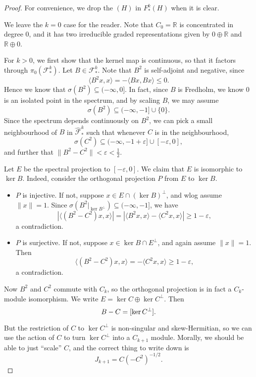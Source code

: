 \documentclass{shortart}
\theoremstyle{definition}
\newcommand\R{\mathbb{R}}
\newcommand\bra\langle
\newcommand\ket\rangle
\let\index\relax %
\DeclareMathOperator{\index}{idx}
\begin{document}
\begin{proof}
  For convenience, we drop the $(H)$ in $F^k_*(H)$ when it is clear.

  We leave the $k = 0$ case for the reader. Note that $C_0 = \R$ is concentrated in degree $0$, and it has two irreducible graded representations given by $0 \oplus \R$ and $\R \oplus 0$.

  For $k > 0$, we first show that the kernel map is continuous, so that it factors through $\pi_0(\mathcal{F}_*^k)$. Let $B \in \mathcal{F}^k_*$. Note that $B^2$ is self-adjoint and negative, since
  \[
    \bra B^2 x, x\ket = -\bra Bx, Bx\ket \leq 0.
  \]
  Hence we know that $\sigma(B^2) \subseteq (-\infty, 0]$. In fact, since $B$ is Fredholm, we know $0$ is an isolated point in the spectrum, and by scaling $B$, we may assume
  \[
    \sigma(B^2) \subseteq (-\infty, -1] \cup \{0\}.
  \]
  Since the spectrum depends continuously on $B^2$, we can pick a small neighbourhood of $B$ in $\hat{\mathcal{F}}^k_*$ such that whenever $C$ is in the neighbourhood,
  \[
    \sigma(C^2) \subseteq (-\infty, -1 + \varepsilon] \cup [-\varepsilon, 0],
  \]
  and further that $\|B^2 - C^2\| < \varepsilon < \frac{1}{2}$.

  Let $E$ be the spectral projection to $[-\varepsilon, 0]$. We claim that $E$ is isomorphic to $\ker B$. Indeed, consider the orthogonal projection $P$ from $E$ to $\ker B$.
  \begin{itemize}
    \item $P$ is injective. If not, suppose $x \in E \cap (\ker B)^\perp$, and wlog assume $\|x\| = 1$. Since $\sigma(B^2|_{\ker B^\perp}) \subseteq (-\infty, -1]$, we have
      \[
        |\bra (B^2 - C^2)x, x\ket| = |\bra B^2 x, x\ket - \bra C^2 x, x\ket| \geq 1 - \varepsilon,
      \]
      a contradiction.
    \item $P$ is surjective. If not, suppose $x \in \ker B \cap E^\perp$, and again assume $\|x\| = 1$. Then
      \[
        \bra (B^2 - C^2)x, x\ket = -\bra C^2 x, x\ket \geq 1 - \varepsilon,
      \]
      a contradiction.
  \end{itemize}
  Now $B^2$ and $C^2$ commute with $C_k$, so the orthogonal projection is in fact a $C_k$-module isomorphism. We write $E = \ker C \oplus \ker C^\perp$. Then
  \[
    \index B - \index C = [\ker C^\perp].
  \]

  But the restriction of $C$ to $\ker C^\perp$ is non-singular and skew-Hermitian, so we can use the action of $C$ to turn $\ker C^\perp$ into a $C_{k + 1}$ module. Morally, we should be able to just ``scale'' $C$, and the correct thing to write down is
  \[
    J_{k + 1} = C (-C^2)^{-1/2}.
  \]


\end{proof}
\end{document}
